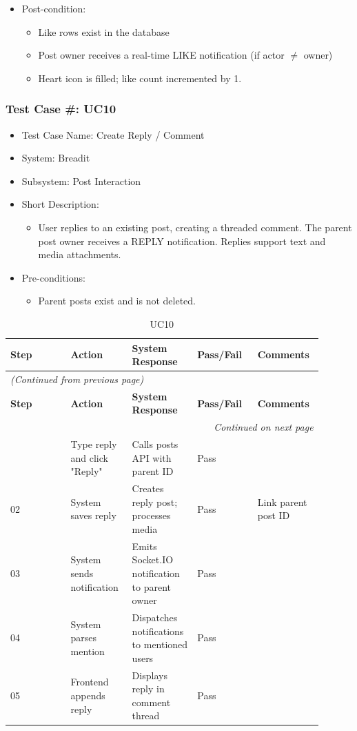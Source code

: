 \begin{itemize}
  \item Post-condition:
\begin{itemize}
  \item Like rows exist in the database
  \item Post owner receives a real-time LIKE notification (if actor $\neq$ owner)
  \item Heart icon is filled; like count incremented by 1.
\end{itemize}
\end{itemize}

\subsubsection{Test Case \#: UC10}
\begin{itemize}
  \item Test Case Name: Create Reply / Comment
  \item System: Breadit
  \item Subsystem: Post Interaction
  \item Short Description:
\begin{itemize}
  \item User replies to an existing post, creating a threaded comment. The parent post owner receives a REPLY notification. Replies support text and media attachments.
\end{itemize}
  \item Pre-conditions:
\begin{itemize}
  \item Parent posts exist and is not deleted.
\end{itemize}
\end{itemize}

\begin{longtable}{|p{0.18\linewidth}|p{0.18\linewidth}|p{0.18\linewidth}|p{0.18\linewidth}|p{0.18\linewidth}|}
\caption{UC10} \label{tab:35} \\
\hline
\textbf{Step} & \textbf{Action} & \textbf{System Response} & \textbf{Pass/Fail} & \textbf{Comments} \\
\hline
\endfirsthead
\multicolumn{5}{l}{\textit{(Continued from previous page)}} \\
\hline
\textbf{Step} & \textbf{Action} & \textbf{System Response} & \textbf{Pass/Fail} & \textbf{Comments} \\
\hline
\endhead
\hline \multicolumn{5}{r}{\textit{Continued on next page}} \\
\endfoot
\hline
\endlastfoot
01 & Type reply and click "Reply" & Calls posts API with parent ID & Pass &  \\
\hline
02 & System saves reply & Creates reply post; processes media & Pass & Link parent post ID \\
\hline
03 & System sends notification & Emits Socket.IO notification to parent owner & Pass &  \\
\hline
04 & System parses mention & Dispatches notifications to mentioned users & Pass &  \\
\hline
05 & Frontend appends reply & Displays reply in comment thread & Pass &  \\
\hline
\end{longtable}


